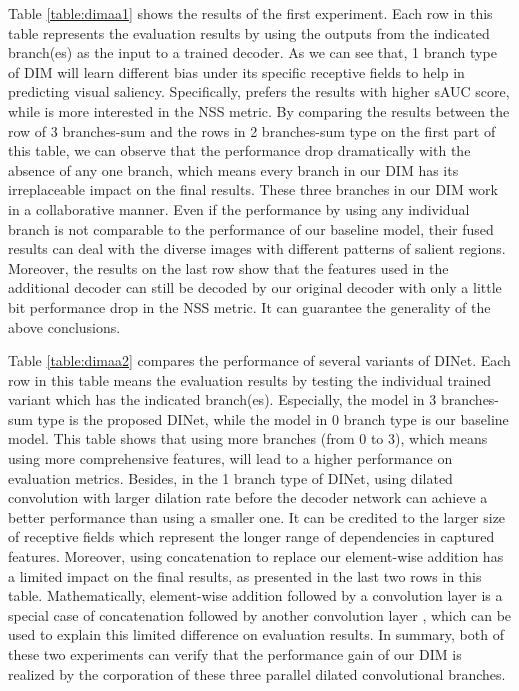 Table \ref{table:dimaa1} shows the results of the first experiment. Each row in this table represents the evaluation results by using the outputs from the indicated branch(es) as the input to a trained decoder. As we can see that, 1 branch type of DIM will learn different bias under its specific receptive fields to help in predicting visual saliency. Specifically,  prefers the results with higher sAUC score, while  is more interested in the NSS metric. By comparing the results between the row of 3 branches-sum and the rows in 2 branches-sum type on the first part of this table, we can observe that the performance drop dramatically with the absence of any one branch, which means every branch in our DIM has its irreplaceable impact on the final results. These three branches in our DIM work in a collaborative manner. Even if the performance by using any individual branch is not comparable to the performance of our baseline model, their fused results can deal with the diverse images with different patterns of salient regions. Moreover, the results on the last row show that the features used in the additional decoder can still be decoded by our original decoder with only a little bit performance drop in the NSS metric. It can guarantee the generality of the above conclusions.


Table \ref{table:dimaa2} compares the performance of several variants of DINet.
 Each row in this table means the evaluation results by testing the individual trained variant which has the indicated branch(es). Especially, the model in 3 branches-sum type is the proposed DINet, while the model in 0 branch type is our baseline model. This table shows that using more branches (from 0 to 3), which means using more comprehensive features, will lead to a higher performance on evaluation metrics. Besides, in the 1 branch type of DINet, using dilated convolution with larger dilation rate before the decoder network can achieve a better performance than using a smaller one. It can be credited to the larger size of receptive fields which represent the longer range of dependencies in captured features. Moreover, using concatenation to replace our element-wise addition has a limited impact on the final results, as presented in the last two rows in this table. Mathematically, element-wise addition followed by a convolution layer is a special case of concatenation followed by another convolution layer \cite{chen2017dual}, which can be used to explain this limited difference on evaluation results. In summary, both of these two experiments can verify that the performance gain of our DIM is realized by the corporation of these three parallel dilated convolutional branches.







